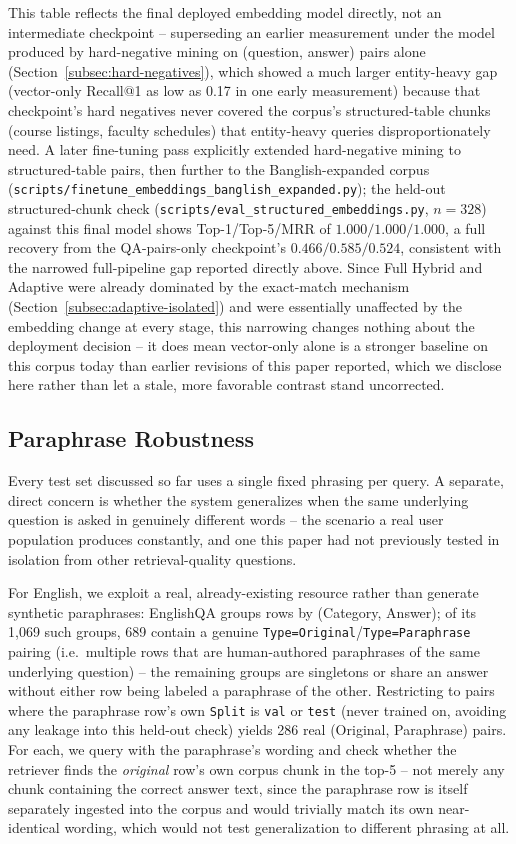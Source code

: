 \documentclass[a4paper,twoside]{article}
\begin{document}
This table reflects the final deployed embedding model directly, not an intermediate checkpoint -- superseding an earlier measurement under the model produced by hard-negative mining on (question, answer) pairs alone (Section~\ref{subsec:hard-negatives}), which showed a much larger entity-heavy gap (vector-only Recall@1 as low as 0.17 in one early measurement) because that checkpoint's hard negatives never covered the corpus's structured-table chunks (course listings, faculty schedules) that entity-heavy queries disproportionately need. A later fine-tuning pass explicitly extended hard-negative mining to structured-table pairs, then further to the Banglish-expanded corpus (\texttt{scripts/finetune\_embeddings\_banglish\_expanded.py}); the held-out structured-chunk check (\texttt{scripts/eval\_structured\_embeddings.py}, $n=328$) against this final model shows Top-1/Top-5/MRR of $1.000/1.000/1.000$, a full recovery from the QA-pairs-only checkpoint's $0.466/0.585/0.524$, consistent with the narrowed full-pipeline gap reported directly above. Since Full Hybrid and Adaptive were already dominated by the exact-match mechanism (Section~\ref{subsec:adaptive-isolated}) and were essentially unaffected by the embedding change at every stage, this narrowing changes nothing about the deployment decision -- it does mean vector-only alone is a stronger baseline on this corpus today than earlier revisions of this paper reported, which we disclose here rather than let a stale, more favorable contrast stand uncorrected.

\subsection{Paraphrase Robustness}
\label{subsec:paraphrase}

Every test set discussed so far uses a single fixed phrasing per query. A separate, direct concern is whether the system generalizes when the same underlying question is asked in genuinely different words -- the scenario a real user population produces constantly, and one this paper had not previously tested in isolation from other retrieval-quality questions.

For English, we exploit a real, already-existing resource rather than generate synthetic paraphrases: EnglishQA groups rows by (Category, Answer); of its 1{,}069 such groups, 689 contain a genuine \texttt{Type=Original}/\texttt{Type=Paraphrase} pairing (i.e.\ multiple rows that are human-authored paraphrases of the same underlying question) -- the remaining groups are singletons or share an answer without either row being labeled a paraphrase of the other. Restricting to pairs where the paraphrase row's own \texttt{Split} is \texttt{val} or \texttt{test} (never trained on, avoiding any leakage into this held-out check) yields 286 real (Original, Paraphrase) pairs. For each, we query with the paraphrase's wording and check whether the retriever finds the \emph{original} row's own corpus chunk in the top-5 -- not merely any chunk containing the correct answer text, since the paraphrase row is itself separately ingested into the corpus and would trivially match its own near-identical wording, which would not test generalization to different phrasing at all.
\end{document}
